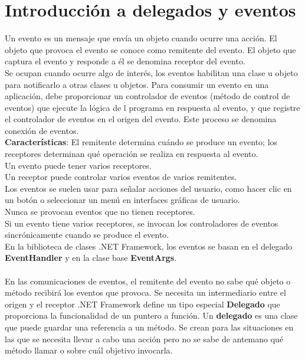 \documentclass[12pt,a4paper]{report}
\begin{document}
\section{Introducción a delegados y eventos}
Un evento es un mensaje que envía un objeto cuando ocurre una acción. El objeto que provoca el evento se conoce como remitente del evento. El objeto que captura el evento y responde a él se denomina receptor del evento.\\Se ocupan cuando ocurre algo de interés, los eventos habilitan una clase u objeto para notificarlo a otras clases u objetos. Para consumir un evento en una aplicación, debe proporcionar un controlador de eventos (método de control de eventos) que ejecute la lógica de	l programa en respuesta al evento, y que registre el controlador de eventos en el origen del evento. Este proceso se denomina conexión de eventos.\\\textbf{Características}: El remitente determina cuándo se produce un evento; los receptores determinan qué operación se realiza en respuesta al evento.\\Un evento puede tener varios receptores.\\Un receptor puede controlar varios eventos de varios remitentes.\\Los eventos se suelen usar para señalar acciones del usuario, como hacer clic en un botón o seleccionar un menú en interfaces gráficas de usuario.\\Nunca se provocan eventos que no tienen receptores.\\Si un evento tiene varios receptores, se invocan los controladores de eventos sincrónicamente cuando se produce el evento.\\En la biblioteca de clases .NET Framework, los eventos se basan en el delegado\textbf{ EventHandler} y en la clase base\textbf{ EventArgs}.\\\\En las comunicaciones de eventos, el remitente del evento no sabe qué objeto o método recibirá los eventos que provoca. Se necesita un intermediario entre el origen y el receptor .NET Framework define un tipo especial\textbf{ Delegado} que proporciona la funcionalidad de un puntero a función. Un\textbf{ delegado} es una clase que puede guardar una referencia a un método. Se crean para las situaciones en las que se necesita llevar a cabo una acción pero no se sabe de antemano qué método llamar o sobre cuál objetivo invocarla.
\end{document}
